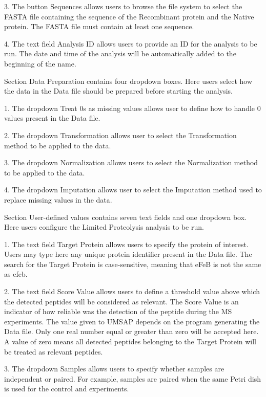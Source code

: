 \num{3}. The button Sequences allows users to browse the file system to select the
FASTA file containing the sequence of the Recombinant protein and the Native protein.
The FASTA file must contain at least one sequence.

\num{4}. The text field Analysis ID allows users to provide an ID for the analysis
to be run. The date and time of the analysis will be automatically added to the
beginning of the name.

Section Data Preparation contains four dropdown boxes. Here users select how the data
in the Data file should be prepared before starting the analysis.

\num{1}. The dropdown Treat \num{0}s as missing values allows user to define how
to handle \num{0} values present in the Data file.

\num{2}. The dropdown Transformation allows user to select the Transformation method
to be applied to the data.

\num{3}. The dropdown Normalization allows users to select the Normalization method
to be applied to the data.

\num{4}. The dropdown Imputation allows user to select the Imputation method used
to replace missing values in the data.

Section User-defined values contains seven text fields and one dropdown box. Here
users configure the Limited Proteolysis analysis to be run.

\num{1}. The text field Target Protein\label{par:limprotTargetProtein} allows users
to specify the protein of interest. Users may type here any unique protein identifier
present in the Data file. The search for the Target Protein is case-sensitive, meaning
that eFeB is not the same as efeb.

\num{2}. The text field Score Value\label{par:limprotScoreValue} allows users to
define a threshold value above which the detected peptides will be considered as
relevant. The Score Value is an indicator of how reliable was the detection of the peptide
during the MS experiments. The value given to UMSAP depends on the program generating
the Data file. Only one real number equal or greater than zero will be accepted here.
A value of zero means all detected peptides belonging to the Target Protein will
be treated as relevant peptides.

\num{3}. The dropdown Samples allows users to specify whether samples are independent
or paired. For example, samples are paired when the same Petri dish is used for the
control and experiments.

